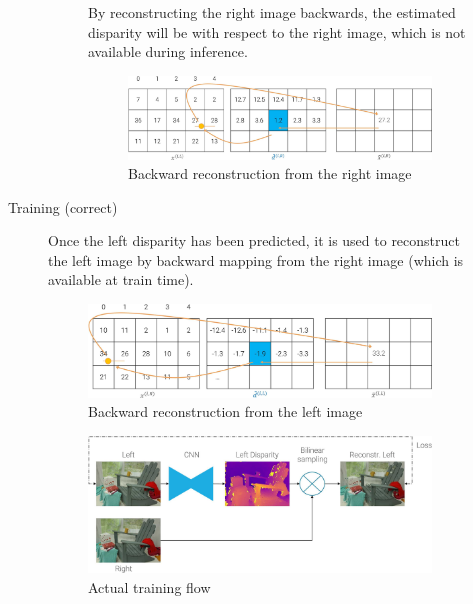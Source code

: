 \begin{description}
\begin{description}
\begin{description}
                        \begin{remark}
                            By reconstructing the right image backwards, the estimated disparity will be with respect to the right image, which is not available during inference.
                        \end{remark}

                        \begin{figure}[H]
                            \centering
                            \includegraphics[width=0.65\linewidth]{./img/_monodepth_train_naive.jpg}
                            \caption{Backward reconstruction from the right image}
                        \end{figure}
                \end{description}

            \item[Training (correct)] 
                Once the left disparity has been predicted, it is used to reconstruct the left image by backward mapping from the right image (which is available at train time).

                \begin{figure}[H]
                    \centering
                    \includegraphics[width=0.65\linewidth]{./img/_monodepth_train_correct.jpg}
                    \caption{Backward reconstruction from the left image}
                \end{figure}

                \begin{figure}[H]
                    \centering
                    \includegraphics[width=0.7\linewidth]{./img/_monodepth_correct.jpg}
                    \caption{Actual training flow}
                \end{figure}


\end{description}
\end{description}
